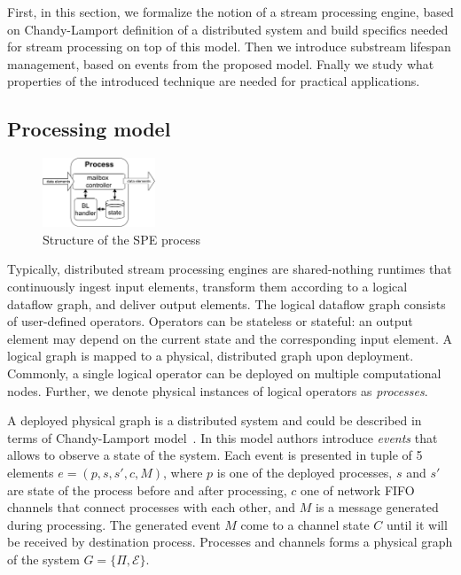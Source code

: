 \label{fs-acker-preliminaries}

First, in this section, we formalize the notion of a stream processing engine, based on Chandy-Lamport definition of a distributed system and build specifics needed for stream processing on top of this model. Then we introduce substream lifespan management, based on events from the proposed model. Fnally we study what properties of the introduced    technique are needed for practical applications.

\subsection{Processing model}

\begin{figure}[htbp]
  \centering
  \includegraphics[width=0.30\textwidth]{pics/process-scheme.pdf}
  \caption{Structure of the SPE process}
  \label{fig:spe_process}
\end{figure}

Typically, distributed stream processing engines are shared-nothing runtimes that continuously ingest input elements, transform them according to a logical dataflow graph, and deliver output elements. The logical dataflow graph consists of user-defined operators. Operators can be stateless or stateful: an output element may depend on the current state and the corresponding input element. A logical graph is mapped to a physical, distributed graph upon deployment. Commonly, a single logical operator can be deployed on multiple computational nodes. Further, we denote physical instances of logical operators as {\em processes}.

A deployed physical graph is a distributed system and could be described in terms of Chandy-Lamport model~\cite{Chandy:1985:DSD:214451.214456}. In this model authors introduce \textit{events} that allows to observe a state of the system. Each event is presented in tuple of 5 elements $e = (p, s, s', c, M)$, where $p$ is one of the deployed processes, $s$ and $s'$ are state of the process before and after processing, $c$ one of network FIFO channels that connect processes with each other, and $M$ is a message generated during processing. The generated event $M$ come to a channel state $C$ until it will be received by destination process. Processes and channels forms a physical graph of the system $G=\{\Pi,\mathcal{E}\}$.

